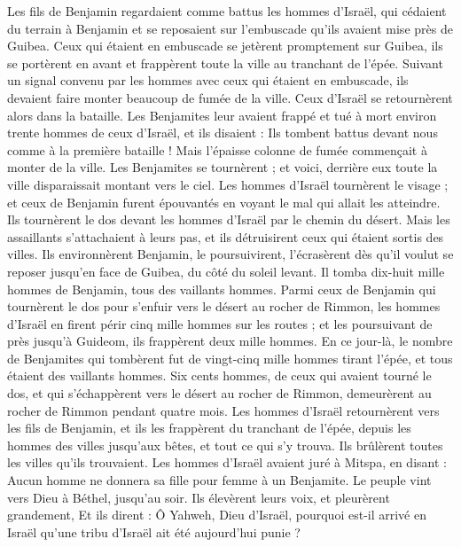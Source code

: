 \begin{multicols}{2}
Les fils de Benjamin regardaient comme battus les hommes d'Israël, qui cédaient du terrain à Benjamin et se reposaient sur l'embuscade qu'ils avaient mise près de Guibea.
Ceux qui étaient en embuscade se jetèrent promptement sur Guibea, ils se portèrent en avant et frappèrent toute la ville au tranchant de l'épée.
Suivant un signal convenu par les hommes avec ceux qui étaient en embuscade, ils devaient faire monter beaucoup de fumée de la ville.
Ceux d'Israël se retournèrent alors dans la bataille. Les Benjamites leur avaient frappé et tué à mort environ trente hommes de ceux d'Israël, et ils disaient : Ils tombent battus devant nous comme à la première bataille !
Mais l'épaisse colonne de fumée commençait à monter de la ville. Les Benjamites se tournèrent ; et voici, derrière eux toute la ville disparaissait montant vers le ciel.
Les hommes d'Israël tournèrent le visage ; et ceux de Benjamin furent épouvantés en voyant le mal qui allait les  atteindre.
Ils tournèrent le dos devant les hommes d'Israël par le chemin du désert. Mais les assaillants s'attachaient à leurs pas, et ils détruisirent ceux qui étaient sortis des villes.
Ils environnèrent Benjamin, le poursuivirent, l'écrasèrent dès qu'il voulut se reposer jusqu'en face de Guibea, du côté du soleil levant.
Il tomba dix-huit mille hommes de Benjamin, tous des vaillants hommes.
Parmi ceux de Benjamin qui tournèrent le dos pour s'enfuir vers le désert au rocher de Rimmon, les hommes d'Israël en firent périr cinq mille hommes sur les routes ; et les poursuivant de près jusqu'à Guideom, ils frappèrent deux mille hommes.
En ce jour-là, le nombre de Benjamites qui tombèrent fut de vingt-cinq mille hommes tirant l'épée, et tous étaient des vaillants hommes.
Six cents hommes, de ceux qui avaient tourné le dos, et qui s'échappèrent vers le désert au rocher de Rimmon, demeurèrent au rocher de Rimmon pendant quatre mois.
Les hommes d'Israël retournèrent vers les fils de Benjamin, et ils les frappèrent du tranchant de l'épée, depuis les hommes des villes jusqu'aux bêtes, et tout ce qui s'y trouva. Ils brûlèrent toutes les villes qu'ils trouvaient.
\VerseOne{}Les hommes d'Israël avaient juré à Mitspa, en disant : Aucun homme ne donnera sa fille pour femme à un Benjamite.
Le peuple vint vers Dieu à Béthel, jusqu'au soir. Ils élevèrent leurs voix, et pleurèrent grandement,
Et ils dirent : Ô Yahweh, Dieu d'Israël, pourquoi est-il arrivé en Israël qu'une tribu d'Israël ait été aujourd'hui punie ?

\end{multicols}
